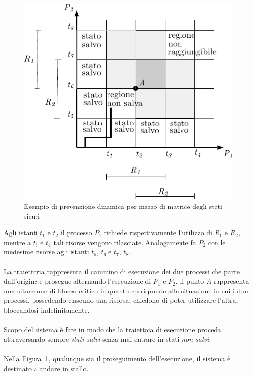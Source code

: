 \documentclass[12pt,a4paper]{article}
\begin{document}
\begin{figure}[H]
  \centering
  \includegraphics{img/sincronizzazione/matrice-stati-sicuri.pdf}
  \caption{Esempio di prevenzione dinamica per mezzo di matrice degli stati sicuri}
  \label{fig:matrice-stati-sicuri}
\end{figure}

Agli istanti $t_1$ e $t_2$ il processo $P_1$ richiede rispettivamente l'utilizzo
di $R_1$ e $R_2$, mentre a $t_3$ e $t_4$ tali risorse vengono rilasciate.
Analogamente fa $P_2$ con le medesime risorse agli istanti $t_5$, $t_6$
e $t_7$, $t_8$.
\\ \\
La traiettoria rappresenta il cammino di esecuzione dei due processi che
parte dall'origine e prosegue alternando l'esecuzione di $P_1$ e $P_2$.
Il punto \textit{A} rappresenta una situazione di blocco critico in quanto
corrisponde alla situazione in cui i due processi, possedendo ciascuno una risorsa,
chiedono di poter utilizzare l'altra, bloccandosi indefinitamente.
\\ \\
Scopo del sistema è fare in modo che la traiettoia di esecuzione proceda
attraversando sempre \emph{stati salvi} senza mai entrare in stati
\emph{non salvi}.
\\ \\
Nella Figura~\ref{fig:matrice-stati-sicuri}, qualunque sia il
proseguimento dell'esecuzione, il sistema è destinato a andare in
stallo.
\end{document}
